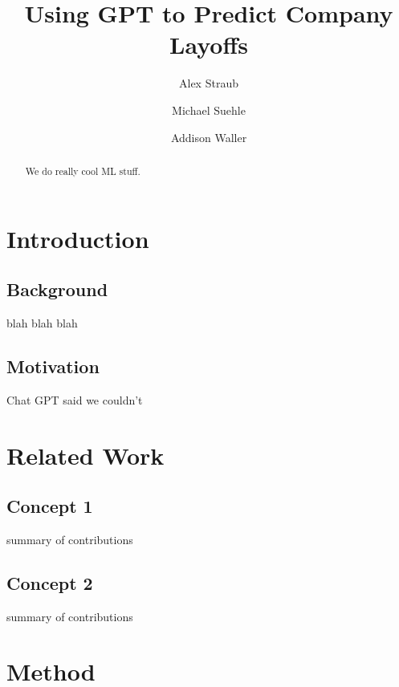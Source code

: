 \documentclass[10pt]{article}
\title{Using GPT to Predict Company Layoffs}
\author{ Alex Straub \and Michael Suehle \and Addison Waller\\}
\begin{document}
\maketitle

\begin{abstract}
  We do really cool ML stuff.
\end{abstract}

%
% 

\section{Introduction}

\subsection{Background}

blah blah blah

\subsection{Motivation}

Chat GPT said we couldn't


%
% 

\section{Related Work}

\subsection{Concept 1}
summary of contributions
\cite{chronos}

\subsection{Concept 2}
summary of contributions


%
% 

\section{Method}
\end{document}
